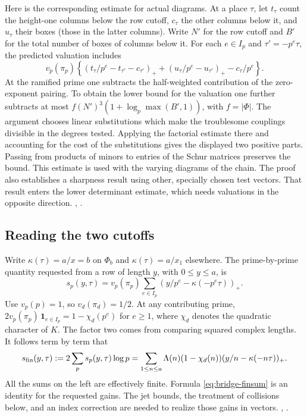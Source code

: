Here is the corresponding estimate for actual diagrams. At a place \(\tau\), let \(t_\tau\) count the height-one columns below the row cutoff, \(c_\tau\) the other columns below it, and \(u_\tau\) their boxes (those in the latter columns). Write \(N'\) for the row cutoff and \(B'\) for the total number of boxes of columns below it. For each \(e\in I_p\) and \(\tau'=-p^e\tau\), the predicted valuation includes
\[
  v_p(\pi_p)\left\{
       (t_\tau/p^e-t_{\tau'}-c_{\tau'})_+
       +(u_\tau/p^e-u_{\tau'})_+-c_\tau/p^e\right\}.
\]
At the ramified prime one subtracts the half-weighted contribution of the zero-exponent pairing. To obtain the lower bound for the valuation one further subtracts at most
\(f(N')^3(1+\log_p\max(B',1))\), with \(f=|\Phi|\). The argument chooses linear substitutions which make the troublesome couplings divisible in the degrees tested. Applying the factorial estimate there and accounting for the cost of the substitutions gives the displayed two positive parts. Passing from products of minors to entries of the Schur matrices preserves the bound. This estimate is used with the varying diagrams of the chain. The proof also establishes a sharpness result using other, specially chosen test vectors. That result enters the lower determinant estimate, which needs valuations in the opposite direction. , .

\subsection{Reading the two cutoffs}

Write \(\kappa(\tau)=a/x=b\) on \(\Phi_b\) and \(\kappa(\tau)=a/x_1\) elsewhere. The prime-by-prime quantity requested from a row of length \(y\), with \(0\le y\le a\), is
\[
 s_p(y,\tau)=v_p(\pi_p)\sum_{e\in I_p}
                  (y/p^e-\kappa(-p^e\tau))_+.
\]
Use \(v_p(p)=1\), so \(v_d(\pi_d)=1/2\). At any contributing prime, \(2v_p(\pi_p)\,\mathbf 1_{e\in I_p}=1-\chi_d(p^e)\) for \(e\ge1\), where \(\chi_d\) denotes the quadratic character of \(K\). The factor two comes from comparing squared complex lengths. It follows term by term that
\begin{equation}\label{eq:bridge-finsum}
 s_{\rm fin}(y,\tau):=2\sum_p s_p(y,\tau)\log p
 =\sum_{1\le n\le a}\Lambda(n)(1-\chi_d(n))(y/n-\kappa(-n\tau))_+ .
\end{equation}
All the sums on the left are effectively finite. Formula \eqref{eq:bridge-finsum} is an identity for the requested gains. The jet bounds, the treatment of collisions below, and an index correction are needed to realize those gains in vectors. , .


